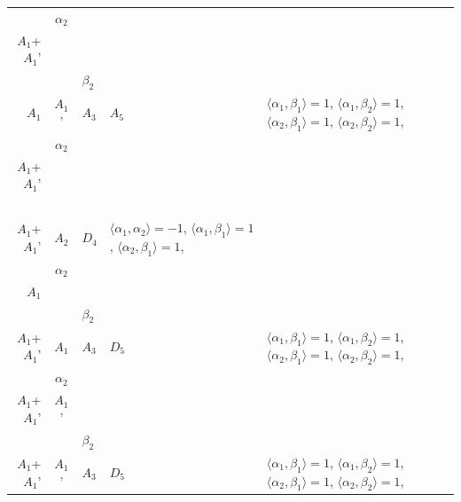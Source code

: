 \documentclass[12pt]{report}
\begin{document}
\begin{appendix}
{\begin{longtable}{rcl p{1cm}p{1cm}p{3cm} }
\\
\begin{tabular}{cc}$\alpha_1$+ & $\alpha_2$\\\tiny{ $A_1$+$A_1$' } & \tiny{  }\end{tabular} &\begin{tabular}{c} = \\~ \end{tabular} & \begin{tabular}{cc}$\beta_1$+ & $\beta_2$\\\tiny{ $A_1$ } & \tiny{ $A_1$' }\end{tabular} & $A_3$ & $A_5$ &  $\langle\alpha_1, \beta_1\rangle=1$, $\langle\alpha_1, \beta_2\rangle=1$, $\langle\alpha_2, \beta_1\rangle=1$, $\langle\alpha_2, \beta_2\rangle=1$, 
\\
\begin{tabular}{cc}$\alpha_1$+ & $\alpha_2$\\\tiny{ $A_1$+$A_1$' } & \tiny{  }\end{tabular} &\begin{tabular}{c} = \\~ \end{tabular} & \begin{tabular}{c}$\beta_1$\\\tiny{ $A_1$+$A_1$' }\end{tabular} & $A_2$ & $D_4$ & $\langle\alpha_1, \alpha_2\rangle=-1$,  $\langle\alpha_1, \beta_1\rangle=1$, $\langle\alpha_2, \beta_1\rangle=1$, 
\\
\begin{tabular}{cc}$\alpha_1$+ & $\alpha_2$\\\tiny{ $A_1$ } & \tiny{  }\end{tabular} &\begin{tabular}{c} = \\~ \end{tabular} & \begin{tabular}{cc}$\beta_1$+ & $\beta_2$\\\tiny{ $A_1$+$A_1$' } & \tiny{ $A_1$ }\end{tabular} & $A_3$ & $D_5$ &  $\langle\alpha_1, \beta_1\rangle=1$, $\langle\alpha_1, \beta_2\rangle=1$, $\langle\alpha_2, \beta_1\rangle=1$, $\langle\alpha_2, \beta_2\rangle=1$, 
\\
\begin{tabular}{cc}$\alpha_1$+ & $\alpha_2$\\\tiny{ $A_1$+$A_1$' } & \tiny{ $A_1$' }\end{tabular} &\begin{tabular}{c} = \\~ \end{tabular} & \begin{tabular}{cc}$\beta_1$+ & $\beta_2$\\\tiny{ $A_1$+$A_1$' } & \tiny{ $A_1$' }\end{tabular} & $A_3$ & $D_5$ &  $\langle\alpha_1, \beta_1\rangle=1$, $\langle\alpha_1, \beta_2\rangle=1$, $\langle\alpha_2, \beta_1\rangle=1$, $\langle\alpha_2, \beta_2\rangle=1$, 

\end{longtable}}
\end{appendix}
\end{document}
